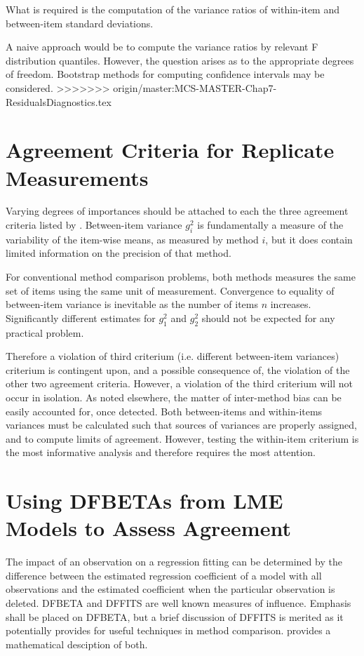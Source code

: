 \documentclass[12pt, a4paper]{report}
\theoremstyle{plain}
\theoremstyle{definition}
\theoremstyle{remark}
\begin{document}
What is required is the computation of the variance ratios of within-item and between-item standard deviations.
	
	A naive approach would be to compute the variance ratios by relevant F distribution quantiles. However, the question arises as to the appropriate degrees of freedom.
	Bootstrap methods for computing confidence intervals may be considered.
>>>>>>> origin/master:MCS-MASTER-Chap7-ResidualsDiagnostics.tex
	

\section{Agreement Criteria for Replicate Measurements}	


Varying degrees of importances should be attached to each the three agreement criteria listed by \citet{Barnhart}. Between-item variance $g^2_i$ is fundamentally a measure of the variability of the item-wise means, as measured by method $i$, but it does contain limited information on the precision of that method. 

For conventional method comparison problems, both methods measures the same set of items using the same unit of measurement. Convergence to equality of between-item variance is inevitable as the number of items $n$ increases. Significantly different estimates for $g^2_1$ and $g^2_2$ should not be expected for any practical problem. 

Therefore a violation of third criterium (i.e. different between-item variances) criterium is contingent upon, and a  
possible consequence of, the violation of the other two agreement criteria. However, a violation of the third criterium will not occur in isolation. As noted elsewhere, the matter of inter-method bias can be easily accounted for, once detected. Both between-items and within-items variances must be calculated such that sources of variances are properly assigned, and to compute limits of agreement. However, testing the within-item criterium is the most informative analysis and therefore requires the most attention. 





	
\section{Using DFBETAs from LME Models to Assess Agreement}

The impact of an observation on a regression fitting can be determined by the difference between the estimated regression coefficient of a model with all observations and the estimated coefficient when the particular observation is deleted. DFBETA and DFFITS are well known measures of influence. Emphasis shall be placed on DFBETA, but a brief discussion of DFFITS is merited as it potentially provides for useful techniques in method comparison. \citet{schabenberger} provides a mathematical desciption of both.
\end{document}
